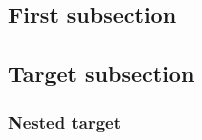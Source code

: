 \documentclass{article}
\begin{document}
\subsection{First subsection}\label{sec:first}
\subsection{Target subsection}\label{sec:target}
\subsubsection{Nested target}\label{sec:nested}
\end{document}
